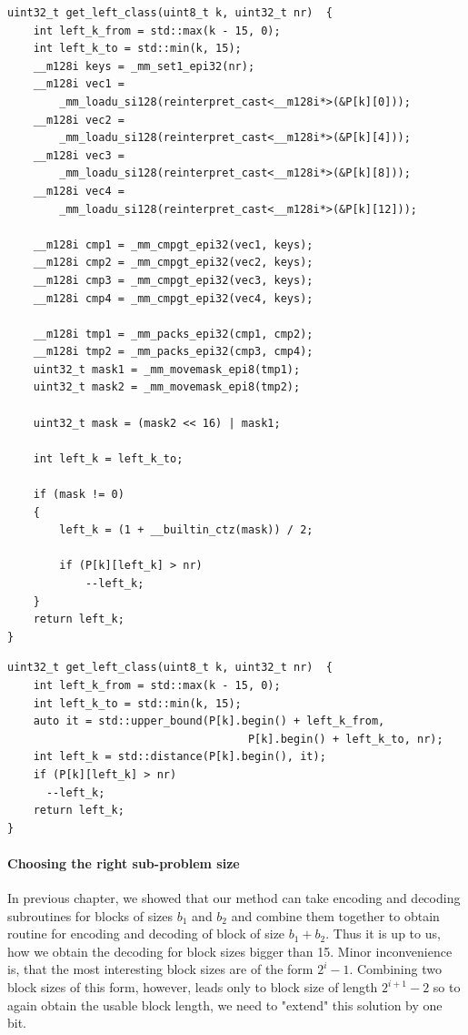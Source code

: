 \begin{lstlisting}
uint32_t get_left_class(uint8_t k, uint32_t nr)  {
	int left_k_from = std::max(k - 15, 0);
	int left_k_to = std::min(k, 15);
	__m128i keys = _mm_set1_epi32(nr);
	__m128i vec1 =
		_mm_loadu_si128(reinterpret_cast<__m128i*>(&P[k][0]));
	__m128i vec2 =
		_mm_loadu_si128(reinterpret_cast<__m128i*>(&P[k][4]));
	__m128i vec3 =
		_mm_loadu_si128(reinterpret_cast<__m128i*>(&P[k][8]));
	__m128i vec4 =
		_mm_loadu_si128(reinterpret_cast<__m128i*>(&P[k][12]));

	__m128i cmp1 = _mm_cmpgt_epi32(vec1, keys);
	__m128i cmp2 = _mm_cmpgt_epi32(vec2, keys);
	__m128i cmp3 = _mm_cmpgt_epi32(vec3, keys);
	__m128i cmp4 = _mm_cmpgt_epi32(vec4, keys);

	__m128i tmp1 = _mm_packs_epi32(cmp1, cmp2);
	__m128i tmp2 = _mm_packs_epi32(cmp3, cmp4);
	uint32_t mask1 = _mm_movemask_epi8(tmp1);
	uint32_t mask2 = _mm_movemask_epi8(tmp2);

	uint32_t mask = (mask2 << 16) | mask1;

	int left_k = left_k_to;

	if (mask != 0)
	{
		left_k = (1 + __builtin_ctz(mask)) / 2;

		if (P[k][left_k] > nr)
			--left_k;
	}
	return left_k;
}
\end{lstlisting}

\begin{lstlisting}
uint32_t get_left_class(uint8_t k, uint32_t nr)  {
	int left_k_from = std::max(k - 15, 0);
	int left_k_to = std::min(k, 15);
	auto it = std::upper_bound(P[k].begin() + left_k_from,
                                     P[k].begin() + left_k_to, nr);
    int left_k = std::distance(P[k].begin(), it);
    if (P[k][left_k] > nr)
      --left_k;
	return left_k;
}
\end{lstlisting}

\paragraph{Choosing the right sub-problem size}

In previous chapter, we showed that our method can take encoding and decoding subroutines
for blocks of sizes $b_1$ and $b_2$ and combine them together to obtain routine for encoding and
decoding of block of size $b_1+b_2$. Thus it is up to us, how we obtain the decoding for block sizes
bigger than 15. Minor inconvenience is, that the most interesting block sizes are of the form $2^i-1$.
Combining two block sizes of this form, however, leads only to block size of length $2^{i+1}-2$
so to again obtain the usable block length, we need to "extend" this solution by one bit.


